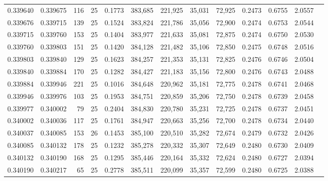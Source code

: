 \begin{tabular}{rrrrrrrrrrrrr}
0.339640 & 0.339675 &   116 &  25 &                                     0.1773 & 383,685 & 221,925 &  35,031 &  72,925 & 0.2473 & 0.6755 & 2.0557 \\
0.339676 & 0.339715 &   139 &  25 &                                     0.1524 & 383,824 & 221,786 &  35,056 &  72,900 & 0.2474 & 0.6753 & 2.0544 \\
0.339715 & 0.339760 &   153 &  25 &                                     0.1404 & 383,977 & 221,633 &  35,081 &  72,875 & 0.2474 & 0.6750 & 2.0530 \\
0.339760 & 0.339803 &   151 &  25 &                                     0.1420 & 384,128 & 221,482 &  35,106 &  72,850 & 0.2475 & 0.6748 & 2.0516 \\
0.339803 & 0.339840 &   129 &  25 &                                     0.1623 & 384,257 & 221,353 &  35,131 &  72,825 & 0.2476 & 0.6746 & 2.0504 \\
0.339840 & 0.339884 &   170 &  25 &                                     0.1282 & 384,427 & 221,183 &  35,156 &  72,800 & 0.2476 & 0.6743 & 2.0488 \\
0.339884 & 0.339946 &   221 &  25 &                                     0.1016 & 384,648 & 220,962 &  35,181 &  72,775 & 0.2478 & 0.6741 & 2.0468 \\
0.339946 & 0.339976 &   103 &  25 &                                     0.1953 & 384,751 & 220,859 &  35,206 &  72,750 & 0.2478 & 0.6739 & 2.0458 \\
0.339977 & 0.340002 &    79 &  25 &                                     0.2404 & 384,830 & 220,780 &  35,231 &  72,725 & 0.2478 & 0.6737 & 2.0451 \\
0.340002 & 0.340036 &   117 &  25 &                                     0.1761 & 384,947 & 220,663 &  35,256 &  72,700 & 0.2478 & 0.6734 & 2.0440 \\
0.340037 & 0.340085 &   153 &  26 &                                     0.1453 & 385,100 & 220,510 &  35,282 &  72,674 & 0.2479 & 0.6732 & 2.0426 \\
0.340085 & 0.340132 &   178 &  25 &                                     0.1232 & 385,278 & 220,332 &  35,307 &  72,649 & 0.2480 & 0.6730 & 2.0409 \\
0.340132 & 0.340190 &   168 &  25 &                                     0.1295 & 385,446 & 220,164 &  35,332 &  72,624 & 0.2480 & 0.6727 & 2.0394 \\
0.340190 & 0.340217 &    65 &  25 &                                     0.2778 & 385,511 & 220,099 &  35,357 &  72,599 & 0.2480 & 0.6725 & 2.0388 \\

\end{tabular}
